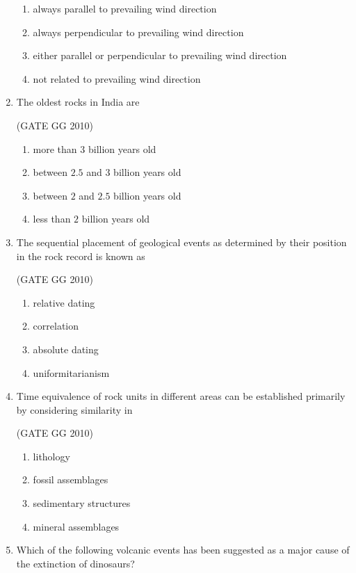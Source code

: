 \documentclass[journal]{IEEEtran}
\begin{document}
\begin{enumerate}[start=1]
\begin{enumerate}
\item always parallel to prevailing wind direction
\item always perpendicular to prevailing wind direction
\item either parallel or perpendicular to prevailing wind direction
\item not related  to prevailing wind direction
\end{enumerate}


\item  The oldest rocks in India are

\hfill{(GATE GG 2010)}

\begin{enumerate}
\item more than $3$ billion years old
\item between $2.5$ and $3$ billion years old
\item between $2$ and $2.5$ billion years old
\item less than $2$ billion years old
\end{enumerate}


\item  The sequential placement of geological events as determined by their position in the rock record is known as

\hfill{(GATE GG 2010)}

\begin{enumerate}
\item relative dating
\item correlation
\item absolute dating
\item uniformitarianism
\end{enumerate}


\item  Time equivalence of rock units in different areas  can be established primarily by considering similarity in

\hfill{(GATE GG 2010)}

\begin{enumerate}
\item lithology
\item fossil assemblages
\item sedimentary structures
\item mineral assemblages
\end{enumerate}

\item  Which of the following volcanic events has been suggested as a major cause of the extinction of dinosaurs?


\end{enumerate}
\end{document}
